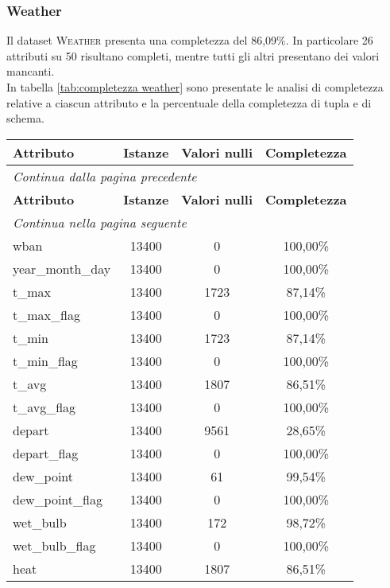\subsubsection*{Weather}
Il dataset \textsc{Weather} presenta una completezza del 86,09\%. In particolare 26 attributi su 50 risultano completi, mentre tutti gli altri presentano dei valori mancanti.\\
In tabella \ref{tab:completezza weather} sono presentate le analisi di completezza relative a ciascun attributo e la percentuale della completezza di tupla e di schema.

	\begin{longtable}{lccc}
		\toprule
		\textbf{Attributo} \quad & \textbf{Istanze} & \textbf{Valori nulli} & 
		\textbf{Completezza} \\
		\midrule
		\endfirsthead
		\multicolumn{4}{l}{\footnotesize\itshape Continua dalla pagina precedente} \\
		\toprule
		\textbf{Attributo} \quad & \textbf{Istanze} & \textbf{Valori nulli} & 
		\textbf{Completezza} \\
		\midrule			
		\endhead
		\multicolumn{4}{l}{\footnotesize\itshape Continua nella pagina 
		seguente} \\
		\endfoot
		\endlastfoot
		wban				& 13400 & 0		 	 & 100,00\%  	\\	
		year\_month\_day	& 13400 & 0		 	 & 100,00\%  	\\	
		t\_max				& 13400 & 1723	     & 87,14\%  	\\
		t\_max\_flag		& 13400 & 0		     & 100,00\% 	\\	
		t\_min				& 13400 & 1723	     & 87,14\%  	\\
		t\_min\_flag		& 13400 & 0		     & 100,00\% 	\\	
		t\_avg				& 13400 & 1807	     & 86,51\%  	\\
		t\_avg\_flag		& 13400 & 0		     & 100,00\% 	\\	
		depart				& 13400 & 9561	     & 28,65\%  	\\
		depart\_flag		& 13400 & 0		     & 100,00\% 	\\	
		dew\_point			& 13400 & 61	   	 & 99,54\%  	\\
		dew\_point\_flag	& 13400 & 0		     & 100,00\% 	\\		
		wet\_bulb			& 13400 & 172	     & 98,72\%  	\\
		wet\_bulb\_flag		& 13400 & 0		     & 100,00\% 	\\	
		heat				& 13400 & 1807	     & 86,51\%  	\\

\end{longtable}
